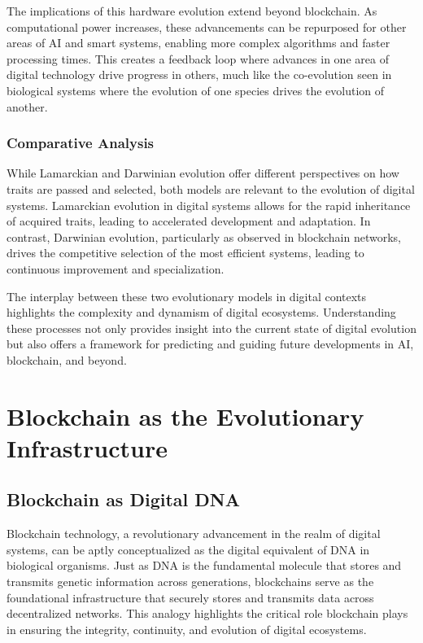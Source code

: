 \documentclass[12pt,twoside]{article}
\begin{document}
The implications of this hardware evolution extend beyond blockchain. As computational power increases, these advancements can be repurposed for other areas of AI and smart systems, enabling more complex algorithms and faster processing times. This creates a feedback loop where advances in one area of digital technology drive progress in others, much like the co-evolution seen in biological systems where the evolution of one species drives the evolution of another.

\subsubsection{Comparative Analysis}

While Lamarckian and Darwinian evolution offer different perspectives on how traits are passed and selected, both models are relevant to the evolution of digital systems. Lamarckian evolution in digital systems allows for the rapid inheritance of acquired traits, leading to accelerated development and adaptation. In contrast, Darwinian evolution, particularly as observed in blockchain networks, drives the competitive selection of the most efficient systems, leading to continuous improvement and specialization.

The interplay between these two evolutionary models in digital contexts highlights the complexity and dynamism of digital ecosystems. Understanding these processes not only provides insight into the current state of digital evolution but also offers a framework for predicting and guiding future developments in AI, blockchain, and beyond.


\section{Blockchain as the Evolutionary Infrastructure}

\subsection{Blockchain as Digital DNA}

Blockchain technology, a revolutionary advancement in the realm of digital systems, can be aptly conceptualized as the digital equivalent of DNA in biological organisms. Just as DNA is the fundamental molecule that stores and transmits genetic information across generations, blockchains serve as the foundational infrastructure that securely stores and transmits data across decentralized networks. This analogy highlights the critical role blockchain plays in ensuring the integrity, continuity, and evolution of digital ecosystems.
\end{document}
